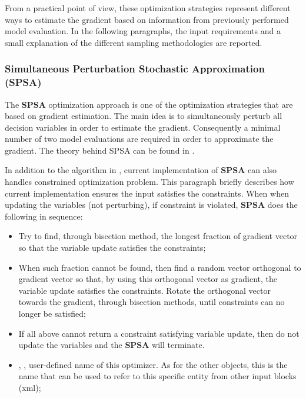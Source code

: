 From a practical point of view, these optimization strategies represent different ways to estimate the gradient based on information from previously performed model evaluation. In the following paragraphs, the input requirements and a small explanation of the different sampling methodologies are reported.


\subsubsection{Simultaneous Perturbation Stochastic Approximation (SPSA)}
\label{subsubsubsec:SPSA}
The \textbf{SPSA} optimization approach is one of the optimization strategies that are based on gradient estimation. The main idea is to simultaneously perturb all decision variables in order to estimate the gradient. Consequently a minimal number of two model evaluations are required in order to approximate the gradient. The theory behind SPSA can be found in \cite{spall1998implementation}. 

In addition to the algorithm in \cite{spall1998implementation}, current implementation of \textbf{SPSA} can also handles constrained optimization problem. This paragraph briefly describes how current implementation ensures the input satisfies the constraints. When when updating the variables (not perturbing), if constraint is violated, \textbf{SPSA} does the following in sequence:
\begin{itemize}
\item Try to find, through bisection method, the longest fraction of gradient vector so that the variable update satisfies the constraints; 
\item When such fraction cannot be found, then find a random vector orthogonal to gradient vector so that, by using this orthogonal vector as gradient, the variable update satisfies the constraints. Rotate the orthogonal vector towards the gradient, through bisection methods, until constraints can no longer be satisfied; 
\item If all above cannot return a constraint satisfying variable update, then do not update the variables and the \textbf{SPSA} will terminate. 
\end{itemize}
 

%

%
\attrsIntro
\vspace{-5mm}
\begin{itemize}
\itemsep0em
\item {}, , user-defined name of this optimizer. \nb As for the other objects, this is the name that can be used to refer to this specific entity from other input blocks (xml);
\end{itemize}
\vspace{-5mm}

